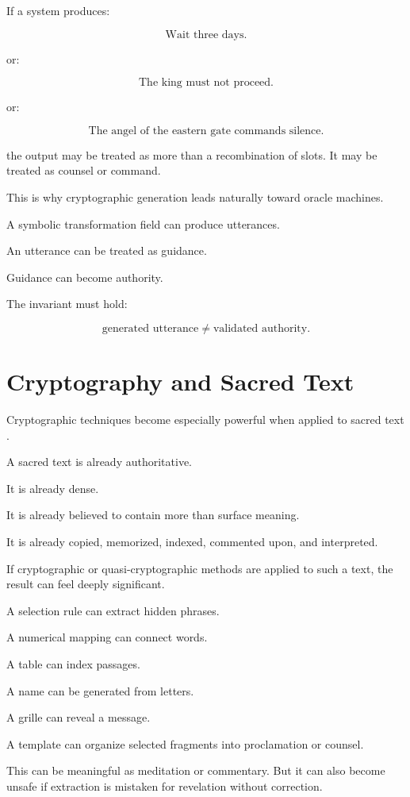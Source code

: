 \documentclass[11pt]{book}
\begin{document}
If a system produces:

\[
\text{Wait three days.}
\]

or:

\[
\text{The king must not proceed.}
\]

or:

\[
\text{The angel of the eastern gate commands silence.}
\]

the output may be treated as more than a recombination of slots. It may be treated as counsel or command.

This is why cryptographic generation leads naturally toward oracle machines.

A symbolic transformation field can produce utterances.

An utterance can be treated as guidance.

Guidance can become authority.

The invariant must hold:

\[
\text{generated utterance} \neq \text{validated authority}.
\]

\section{Cryptography and Sacred Text}

Cryptographic techniques become especially powerful when applied to sacred text \cite{Eco1995SearchPerfectLanguage,Yates1966ArtMemory,Trithemius1999Steganographia}.

A sacred text is already authoritative.

It is already dense.

It is already believed to contain more than surface meaning.

It is already copied, memorized, indexed, commented upon, and interpreted.

If cryptographic or quasi-cryptographic methods are applied to such a text, the result can feel deeply significant.

A selection rule can extract hidden phrases.

A numerical mapping can connect words.

A table can index passages.

A name can be generated from letters.

A grille can reveal a message.

A template can organize selected fragments into proclamation or counsel.

This can be meaningful as meditation or commentary. But it can also become unsafe if extraction is mistaken for revelation without correction.
\end{document}
